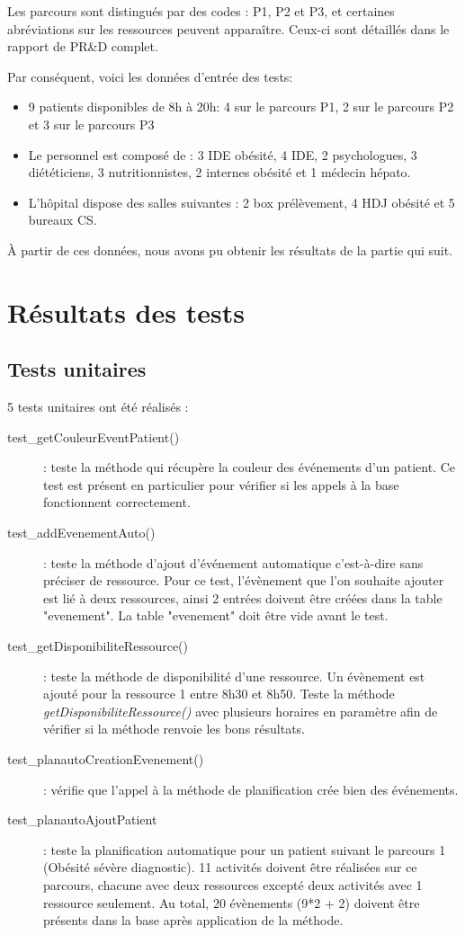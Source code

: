 \documentclass{polytech/polytech}
\begin{document}
Les parcours sont distingués par des codes : P1, P2 et P3, et certaines abréviations sur les ressources peuvent apparaître. Ceux-ci sont détaillés dans le rapport de PR\&D complet.

Par conséquent, voici les données d'entrée des tests:

\begin{itemize}
	\item 9 patients disponibles de 8h à 20h: 4 sur le parcours P1, 2 sur le parcours P2 et 3 sur le parcours P3
	\item Le personnel est composé de : 3 IDE obésité, 4 IDE, 2 psychologues, 3 diététiciens, 3 nutritionnistes, 2 internes obésité et 1 médecin hépato.
	\item L'hôpital dispose des salles suivantes : 2 box prélèvement, 4 HDJ obésité et 5 bureaux CS.
\end{itemize}

À partir de ces données, nous avons pu obtenir les résultats de la partie qui suit.

\section{Résultats des tests}

\subsection{Tests unitaires}

5 tests unitaires ont été réalisés : 

\begin{description}
	\item[test\_getCouleurEventPatient()] : teste la méthode qui récupère la couleur des événements d'un patient. Ce test est présent en particulier pour vérifier si les appels à la base fonctionnent correctement.
	\item[test\_addEvenementAuto()] : teste la méthode d'ajout d'événement automatique c'est-à-dire sans préciser de ressource. Pour ce test, l'évènement que l'on souhaite ajouter est lié à deux ressources, ainsi 2 entrées doivent être créées dans la table "evenement". La table "evenement" doit être vide avant le test.
	\item[test\_getDisponibiliteRessource()] : teste la méthode de disponibilité d'une ressource. Un évènement est ajouté pour la ressource 1 entre 8h30 et 8h50. Teste la méthode \textit{getDisponibiliteRessource()} avec plusieurs horaires en paramètre afin de vérifier si la méthode renvoie les bons résultats.
	\item[test\_planautoCreationEvenement()] : vérifie que l'appel à la méthode de planification crée bien des événements.
	\item[test\_planautoAjoutPatient] : teste la planification automatique pour un patient suivant le parcours 1 (Obésité sévère diagnostic). 11 activités doivent être réalisées sur ce parcours, chacune avec deux ressources excepté deux activités avec 1 ressource seulement. Au total, 20 évènements (9*2 + 2) doivent être présents dans la base après application de la méthode.
\end{description}
\end{document}
